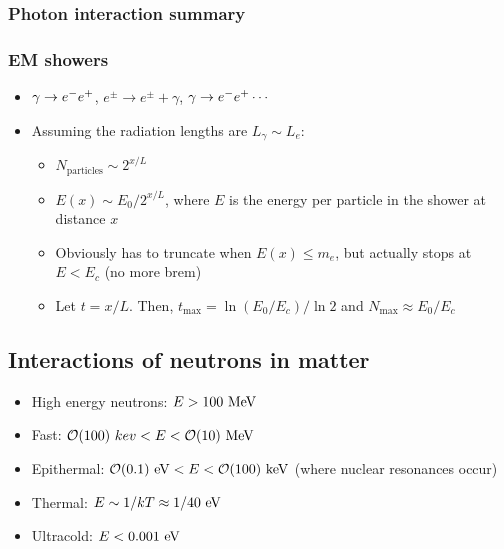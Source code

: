 \subsubsection{Photon interaction summary}


\subsubsection{EM showers}
\begin{itemize}
  \item $\gamma\rightarrow e^{-}e^{+}$, $e^\pm\rightarrow e^\pm+\gamma$, $\gamma\rightarrow e^{-}e^{+}\cdots$
  \item Assuming the radiation lengths are $L_\gamma\sim L_e$:
  \begin{itemize}
    \item $N_\text{particles}\sim 2^{x/L}$
    \item $E(x)\sim E_0/2^{x/L}$, where $E$ is the energy per particle in the shower at distance $x$
    \item Obviously has to truncate when $E(x)\leq m_e$, but actually stops at $E<E_c$ (no more brem)
    \item Let $t=x/L$. Then, $t_{\max} = \ln(E_0/E_c)/\ln2$ and $N_{\max}\approx E_0/E_c$
  \end{itemize}
\end{itemize}

\subsection{Interactions of neutrons in matter}
\begin{itemize}
  \item High energy neutrons: $E>100~\text{MeV}$
  \item Fast: $\mathcal{O}(100)~kev < E < \mathcal{O}(10)~\text{MeV}$
  \item Epithermal: $\mathcal{O}(0.1)~\text{eV} < E <\mathcal{O}(100)~\text{keV}$ (where nuclear resonances occur)
  \item Thermal: $E\sim 1/kT \approx 1/40~\text{eV}$
  \item Ultracold: $E<0.001~\text{eV}$
\end{itemize}
